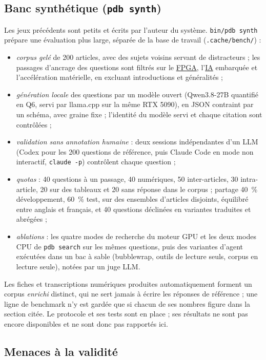 \documentclass[11pt,a4paper]{article}
\newcommand{\cmd}[1]{\texttt{#1}}
\newcommand{\gl}[2]{\hyperlink{gl:#1}{\textcolor{glcolor}{#2}}}
\begin{document}
\subsection{Banc synthétique (\cmd{pdb synth})}
\label{sec:synth}

Les jeux précédents sont petits et écrits par l'auteur du système. \cmd{bin/pdb synth}
prépare une évaluation plus large, séparée de la base de travail (\cmd{.cache/bench/}) :
\begin{itemize}
  \item \emph{corpus gelé} de 200 articles, avec des sujets voisins servant de distracteurs ;
    les passages d'ancrage des questions sont filtrés sur le \gl{FPGA}{FPGA}, l'\gl{AI}{IA} embarquée et
    l'accélération matérielle, en excluant introductions et généralités ;
  \item \emph{génération locale} des questions par un modèle ouvert (Qwen3.8-27B quantifié
    en Q6, servi par llama.cpp sur la même RTX 5090), en JSON contraint par un schéma, avec
    graine fixe ; l'identité du modèle servi et chaque citation sont contrôlées ;
  \item \emph{validation sans annotation humaine} : deux sessions indépendantes d'un LLM
    (Codex pour les 200 questions de référence, puis Claude Code en mode non interactif,
    \cmd{claude -p}) contrôlent chaque question ;
  \item \emph{quotas} : 40 questions à un passage, 40 numériques, 50 inter-articles, 30
    intra-article, 20 sur des tableaux et 20 sans réponse dans le corpus ; partage 40~\%
    développement, 60~\% test, sur des ensembles d'articles disjoints, équilibré entre
    anglais et français, et 40 questions déclinées en variantes traduites et abrégées ;
  \item \emph{ablations} : les quatre modes de recherche du moteur GPU et les deux modes
    CPU de \cmd{pdb search} sur les mêmes questions, puis des variantes d'agent exécutées dans
    un bac à sable (bubblewrap, outils de lecture seuls, corpus en lecture seule), notées par
    un juge LLM.
\end{itemize}
Les fiches et transcriptions numériques produites automatiquement forment un corpus
\emph{enrichi} distinct, qui ne sert jamais à écrire les réponses de référence ; une ligne de
benchmark n'y est gardée que si chacun de ses nombres figure dans la section citée. Le
protocole et ses tests sont en place ; ses résultats ne sont pas encore disponibles et ne
sont donc pas rapportés ici.

\subsection{Menaces à la validité}
\end{document}
